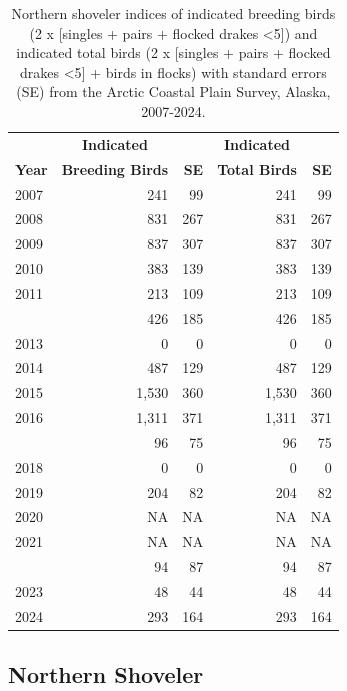 \documentclass[
]{article}
\begin{document}
\begin{longtable}[t]{lrrrr}

\caption{\label{tbl-NSHO}Northern shoveler indices of indicated breeding
birds (2 x {[}singles + pairs + flocked drakes \textless5{]}) and
indicated total birds (2 x {[}singles + pairs + flocked drakes
\textless5{]} + birds in flocks) with standard errors (SE) from the
Arctic Coastal Plain Survey, Alaska, 2007-2024.}

\tabularnewline

\\
\toprule
\multicolumn{1}{c}{\textbf{ }} & \multicolumn{1}{c}{\textbf{Indicated}} & \multicolumn{1}{c}{\textbf{ }} & \multicolumn{1}{c}{\textbf{Indicated}} & \multicolumn{1}{c}{\textbf{ }} \\
\cmidrule(l{3pt}r{3pt}){2-2} \cmidrule(l{3pt}r{3pt}){4-4}
\textbf{Year} & \textbf{Breeding Birds} & \textbf{SE} & \textbf{Total Birds} & \textbf{SE}\\
\midrule
2007 & 241 & 99 & 241 & 99\\
2008 & 831 & 267 & 831 & 267\\
2009 & 837 & 307 & 837 & 307\\
2010 & 383 & 139 & 383 & 139\\
2011 & 213 & 109 & 213 & 109\\
\addlinespace
2012 & 426 & 185 & 426 & 185\\
2013 & 0 & 0 & 0 & 0\\
2014 & 487 & 129 & 487 & 129\\
2015 & 1,530 & 360 & 1,530 & 360\\
2016 & 1,311 & 371 & 1,311 & 371\\
\addlinespace
2017 & 96 & 75 & 96 & 75\\
2018 & 0 & 0 & 0 & 0\\
2019 & 204 & 82 & 204 & 82\\
2020 & NA & NA & NA & NA\\
2021 & NA & NA & NA & NA\\
\addlinespace
2022 & 94 & 87 & 94 & 87\\
2023 & 48 & 44 & 48 & 44\\
2024 & 293 & 164 & 293 & 164\\
\bottomrule

\end{longtable}

\endgroup{}

\newpage{}

\subsection*{Northern Shoveler}\label{northern-shoveler-2}
\end{document}
